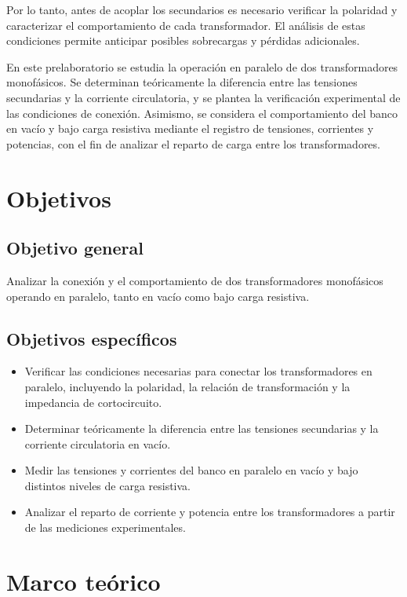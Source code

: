 \documentclass[12pt]{article}
\begin{document}
Por lo tanto, antes de acoplar los secundarios es necesario verificar la polaridad y caracterizar el comportamiento de cada transformador. El an\'alisis de estas condiciones permite anticipar posibles sobrecargas y p\'erdidas adicionales.

En este prelaboratorio se estudia la operaci\'on en paralelo de dos transformadores monof\'asicos. Se determinan te\'oricamente la diferencia entre las tensiones secundarias y la corriente circulatoria, y se plantea la verificaci\'on experimental de las condiciones de conexi\'on. Asimismo, se considera el comportamiento del banco en vac\'io y bajo carga resistiva mediante el registro de tensiones, corrientes y potencias, con el fin de analizar el reparto de carga entre los transformadores.

\newpage

\section{Objetivos}

\subsection*{Objetivo general}
Analizar la conexi\'on y el comportamiento de dos transformadores monof\'asicos operando en paralelo, tanto en vac\'io como bajo carga resistiva.

\subsection*{Objetivos espec\'ificos}
\begin{itemize}
    \item Verificar las condiciones necesarias para conectar los transformadores en paralelo, incluyendo la polaridad, la relaci\'on de transformaci\'on y la impedancia de cortocircuito.
    \item Determinar te\'oricamente la diferencia entre las tensiones secundarias y la corriente circulatoria en vac\'io.
    \item Medir las tensiones y corrientes del banco en paralelo en vac\'io y bajo distintos niveles de carga resistiva.
    \item Analizar el reparto de corriente y potencia entre los transformadores a partir de las mediciones experimentales.
\end{itemize}
\newpage

\section{Marco te\'orico}
\end{document}
